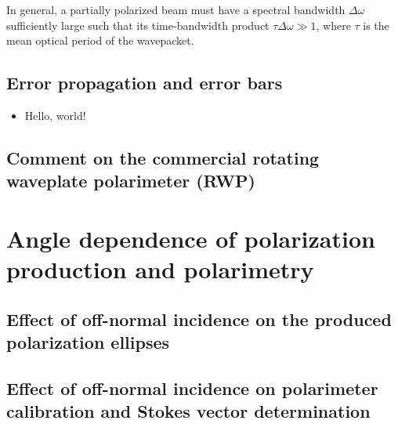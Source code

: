 \documentclass[footinbib,aps,prl,superscriptaddress]{revtex4-1}
\begin{document}
In general, a partially polarized beam must have a spectral bandwidth $\Delta \omega$ sufficiently large such that its time-bandwidth product $\tau \Delta \omega \gg 1$, where $\tau$ is the mean optical period of the wavepacket.

\subsection{Error propagation and error bars}

\begin{itemize}
\item Hello, world!
\end{itemize}

\subsection{Comment on the commercial rotating waveplate polarimeter (RWP)}

\section{Angle dependence of polarization production and polarimetry}

\subsection{Effect of off-normal incidence on the produced polarization ellipses}

\subsection{Effect of off-normal incidence on polarimeter calibration and Stokes vector determination}




%
\end{document}
